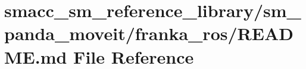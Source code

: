 \hypertarget{smacc__sm__reference__library_2sm__panda__moveit_2franka__ros_2README_8md}{}\section{smacc\+\_\+sm\+\_\+reference\+\_\+library/sm\+\_\+panda\+\_\+moveit/franka\+\_\+ros/\+R\+E\+A\+D\+ME.md File Reference}
\label{smacc__sm__reference__library_2sm__panda__moveit_2franka__ros_2README_8md}
